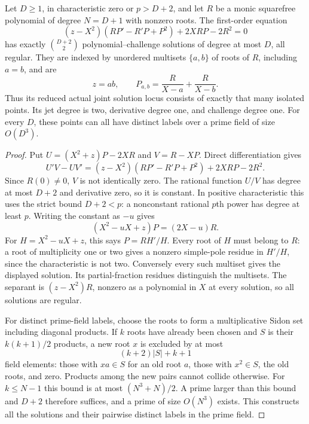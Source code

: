 \begin{theorem}
\label{thm:quadratic-isolated-first-order}
Let $D\ge1$, in characteristic zero or $p>D+2$, and let $R$ be a
monic squarefree polynomial of degree $N=D+1$ with nonzero roots.
The first-order equation
\begin{equation}
 (z-X^2)(RP'-R'P+P^2)+2XRP-2R^2=0
 \label{eq:quadratic-isolated-riccati}
\end{equation}
has exactly $\binom{D+2}{2}$ polynomial--challenge solutions of
degree at most $D$, all regular. They are indexed by unordered
multisets $\{a,b\}$ of roots of $R$, including $a=b$, and are
\[
 z=ab,\qquad P_{a,b}=\frac{R}{X-a}+\frac{R}{X-b}.
\]
Thus its reduced actual joint solution locus consists of exactly
that many isolated points. Its jet degree is two, derivative degree
one, and challenge degree one. For every $D$, these points can all
have distinct labels over a prime field of size $O(D^3)$.
\end{theorem}
\begin{proof}
Put $U=(X^2+z)P-2XR$ and $V=R-XP$. Direct differentiation gives
\[
 U'V-UV'=(z-X^2)(RP'-R'P+P^2)+2XRP-2R^2.
\]
Since $R(0)\ne0$, $V$ is not identically zero. The rational function
$U/V$ has degree at most $D+2$ and derivative zero, so it is
constant. In positive characteristic this uses the strict bound
$D+2<p$: a nonconstant rational $p$th power has degree at least $p$.
Writing the constant as $-u$ gives
\[
 (X^2-uX+z)P=(2X-u)R.
\]
For $H=X^2-uX+z$, this says $P=RH'/H$. Every root of $H$ must
belong to $R$: a root of multiplicity one or two gives a nonzero
simple-pole residue in $H'/H$, since the characteristic is not two.
Conversely every such multiset gives the displayed solution.
Its partial-fraction residues distinguish the multisets. The
separant is $(z-X^2)R$, nonzero as a polynomial in $X$ at every
solution, so all solutions are regular.

For distinct prime-field labels, choose the roots to form a
multiplicative Sidon set including diagonal products. If $k$ roots
have already been chosen and $S$ is their $k(k+1)/2$ products, a
new root $x$ is excluded by at most
\[
 (k+2)|S|+k+1
\]
field elements: those with $xa\in S$ for an old root $a$, those
with $x^2\in S$, the old roots, and zero. Products among the new
pairs cannot collide otherwise. For $k\le N-1$ this bound is at
most $(N^3+N)/2$. A prime larger than this bound and $D+2$ therefore
suffices, and a prime of size $O(N^3)$ exists. This constructs all
the solutions and their pairwise distinct labels in the prime field.
\end{proof}

